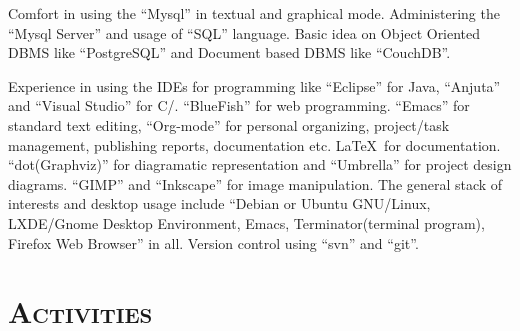 \begin{resume}
\dates{}
\begin{position}
Comfort in using the ``Mysql'' in textual and graphical mode.
Administering the ``Mysql Server'' and usage of ``SQL'' language.
Basic idea on Object Oriented DBMS like ``PostgreSQL'' and Document
based DBMS like ``CouchDB''.
\end{position}

\dates{}
\begin{position}
Experience in using the IDEs for programming like ``Eclipse'' for Java,
``Anjuta'' and ``Visual Studio'' for C/\Cplusplus. ``BlueFish'' for web
programming. ``Emacs'' for standard text editing, ``Org-mode'' for
personal organizing, project/task management, publishing reports,
documentation etc. \LaTeX \ for documentation. ``dot(Graphviz)'' for
diagramatic representation and ``Umbrella'' for project design
diagrams. ``GIMP'' and ``Inkscape'' for image manipulation. The
general stack of interests and desktop usage include ``Debian or
Ubuntu GNU/Linux, LXDE/Gnome Desktop Environment, Emacs,
Terminator(terminal program), Firefox Web Browser'' in all. Version
control using ``svn'' and ``git''.\\
\end{position} 







\section{\textsc{Activities}}

\begin{formatb}
  \\
  \body\\
\end{formatb}


\end{resume}
